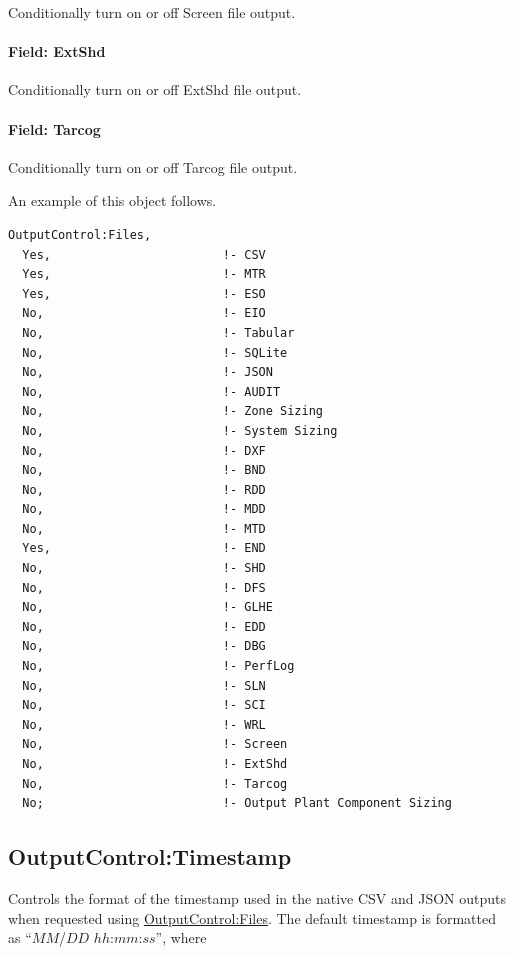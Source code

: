 Conditionally turn on or off Screen file output.

\paragraph{Field: ExtShd}\label{field-ext-shd}

Conditionally turn on or off ExtShd file output.

\paragraph{Field: Tarcog}\label{field-tarcog}

Conditionally turn on or off Tarcog file output.

An example of this object follows.

\begin{lstlisting}
OutputControl:Files,
  Yes,                        !- CSV
  Yes,                        !- MTR
  Yes,                        !- ESO
  No,                         !- EIO
  No,                         !- Tabular
  No,                         !- SQLite
  No,                         !- JSON
  No,                         !- AUDIT
  No,                         !- Zone Sizing
  No,                         !- System Sizing
  No,                         !- DXF
  No,                         !- BND
  No,                         !- RDD
  No,                         !- MDD
  No,                         !- MTD
  Yes,                        !- END
  No,                         !- SHD
  No,                         !- DFS
  No,                         !- GLHE
  No,                         !- EDD
  No,                         !- DBG
  No,                         !- PerfLog
  No,                         !- SLN
  No,                         !- SCI
  No,                         !- WRL
  No,                         !- Screen
  No,                         !- ExtShd
  No,                         !- Tarcog
  No;                         !- Output Plant Component Sizing
\end{lstlisting}

\subsection{OutputControl:Timestamp}\label{outputcontrol_timestamp}

Controls the format of the timestamp used in the native CSV and JSON outputs when requested using \hyperref[outputcontrolfiles]{OutputControl:Files}. The default timestamp is formatted
as ``$MM$/$DD$ $hh$:$mm$:$ss$'', where

